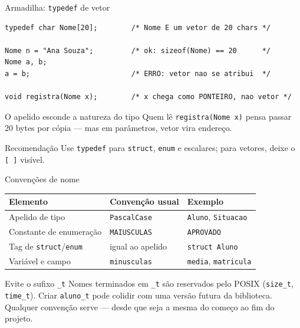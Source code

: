 \documentclass[aspectratio=169]{beamer}
\begin{document}
\begin{frame}[fragile]{Armadilha: \texttt{typedef} de vetor}
\begin{lstlisting}[basicstyle=\ttfamily\scriptsize]
typedef char Nome[20];        /* Nome E um vetor de 20 chars */

Nome n = "Ana Souza";         /* ok: sizeof(Nome) == 20      */
Nome a, b;
a = b;                        /* ERRO: vetor nao se atribui  */

void registra(Nome x);        /* x chega como PONTEIRO, nao vetor */
\end{lstlisting}
  \begin{alertblock}{O apelido esconde a natureza do tipo}
    Quem lê \texttt{registra(Nome x)} pensa passar 20 bytes por cópia --- mas
    em parâmetros, vetor vira endereço.
  \end{alertblock}
  \begin{block}{Recomendação}
    Use \texttt{typedef} para \texttt{struct}, \texttt{enum} e escalares; para
    vetores, deixe o \texttt{[\,]} visível.
  \end{block}
\end{frame}

\begin{frame}{Convenções de nome}
  \begin{center}
  \small
  \begin{tabular}{lll}
    \toprule
    Elemento & Convenção usual & Exemplo \\
    \midrule
    Apelido de tipo & \texttt{PascalCase} & \texttt{Aluno}, \texttt{Situacao} \\
    Constante de enumeração & \texttt{MAIUSCULAS} & \texttt{APROVADO} \\
    Tag de \texttt{struct}/\texttt{enum} & igual ao apelido & \texttt{struct Aluno} \\
    Variável e campo & \texttt{minusculas} & \texttt{media}, \texttt{matricula} \\
    \bottomrule
  \end{tabular}
  \end{center}
  \begin{alertblock}{Evite o sufixo \texttt{\_t}}
    Nomes terminados em \texttt{\_t} são reservados pelo POSIX
    (\texttt{size\_t}, \texttt{time\_t}). Criar \texttt{aluno\_t} pode colidir
    com uma versão futura da biblioteca. Qualquer convenção serve --- desde que
    seja a mesma do começo ao fim do projeto.
  \end{alertblock}
\end{frame}
\end{document}
